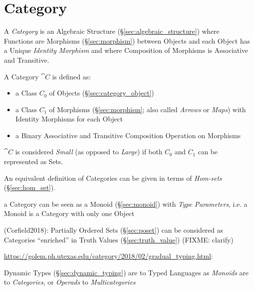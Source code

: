 \section{Category}\label{sec:category}

A \emph{Category} is an Algebraic Structure (\S\ref{sec:algebraic_structure})
where Functions are Morphisms (\S\ref{sec:morphism}) between Objects and each
Object has a Unique \emph{Identity Morphism} and where Composition of Morphisms
is Associative and Transitive.

A Category $\cat{C}$ is defined as:
\begin{itemize}
\item a Class $C_0$ of Objects (\S\ref{sec:category_object})
\item a Class $C_1$ of Morphisms (\S\ref{sec:morphism}; also called
  \emph{Arrows} or \emph{Maps}) with Identity Morphisms for each Object
\item a Binary Associative and Transitive Composition Operation on Morphisms
\end{itemize}
$\cat{C}$ is considered \emph{Small} (as opposed to \emph{Large})
if both $C_0$ and $C_1$ can be represented as Sets.

An equivalent definition of Categories can be given in terms of
\emph{Hom-sets} (\S\ref{sec:hom_set}).

a Category can be seen as a Monoid (\S\ref{sec:monoid}) with \emph{Type
  Parameters}, i.e. a Monoid is a Category with only one Object

(Corfield2018): Partially Ordered Sets (\S\ref{sec:poset}) can be considered as
Categories ``enriched'' in Truth Values (\S\ref{sec:truth_value}) (FIXME:
clarify)

\url{https://golem.ph.utexas.edu/category/2018/02/gradual_typing.html}:

Dynamic Types (\S\ref{sec:dynamic_typing}) are to Typed Languages as
\emph{Monoids} are to \emph{Categories}, or \emph{Operads} to
\emph{Multicategories}

\asterism

